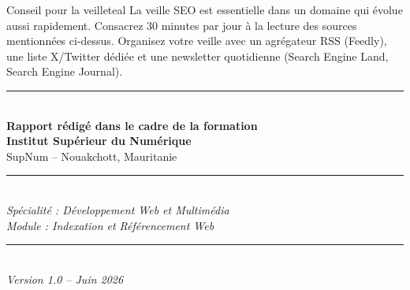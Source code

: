 \documentclass[12pt,a4paper,twoside]{report}
\begin{document}
\vspace{0.5cm}
\begin{mybox}{Conseil pour la veille}{teal}
La veille SEO est essentielle dans un domaine qui évolue aussi rapidement. Consacrez 30 minutes par jour à la lecture des sources mentionnées ci-dessus. Organisez votre veille avec un agrégateur RSS (Feedly), une liste X/Twitter dédiée et une newsletter quotidienne (Search Engine Land, Search Engine Journal).
\end{mybox}

\newpage
\null
\vfill
\begin{center}
\rule{0.5\textwidth}{0.5pt}\\[0.8cm]
{\Large\textbf{Rapport rédigé dans le cadre de la formation}}\\[0.6cm]
{\Huge\textbf{Institut Supérieur du Numérique}}\\[0.3cm]
{\large SupNum -- Nouakchott, Mauritanie}\\[0.6cm]
\rule{0.5\textwidth}{0.5pt}\\[0.6cm]
\textit{Spécialité : Développement Web et Multimédia}\\[0.2cm]
\textit{Module : Indexation et Référencement Web}\\[0.5cm]
\rule{0.5\textwidth}{0.5pt}\\[0.5cm]
\textit{Version 1.0 -- Juin 2026}
\end{center}
\vfill
\end{document}
